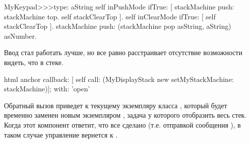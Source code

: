 \documentclass[a4paper,10pt,twoside]{book}
\begin{document}

\begin{code}{}
MyKeypad>>>type: aString
	self inPushMode ifTrue: [
		stackMachine push: stackMachine top.
		self stackClearTop ].
	self inClearMode ifTrue: [ self stackClearTop ].
	stackMachine push: (stackMachine pop asString, aString) asNumber.
\end{code}


Ввод стал работать лучше, но все равно расстраивает отсутствие
возможности видеть, что в стеке.



\begin{code}{}
html anchor
	callback: [ self call: (MyDisplayStack new setMyStackMachine: stackMachine)];
	with: 'open'
\end{code}


Обратный вызов приведет к текущему экземпляру класса ,
который будет временно заменен новым экземпляром ,
задача у которого отобразить весь стек.
Когда этот компонент ответит, что все сделано (т.е. отправкой
сообщения ), в таком случае управление вернется к
.
\end{document}
